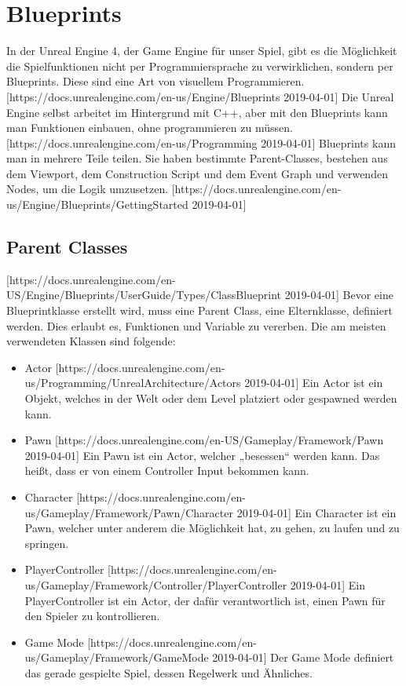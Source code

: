 \section{Blueprints}
In der Unreal Engine 4, der Game Engine für unser Spiel, gibt es die Möglichkeit die Spielfunktionen nicht per Programmiersprache zu verwirklichen, sondern per Blueprints.
Diese sind eine Art von visuellem Programmieren. [https://docs.unrealengine.com/en-us/Engine/Blueprints 2019-04-01]
Die Unreal Engine selbst arbeitet im Hintergrund mit C++, aber mit den Blueprints kann man Funktionen einbauen, ohne programmieren zu müssen. [https://docs.unrealengine.com/en-us/Programming 2019-04-01]
Blueprints kann man in mehrere Teile teilen.
Sie haben bestimmte Parent-Classes, bestehen aus dem Viewport, dem Construction Script und dem Event Graph und verwenden Nodes, um die Logik umzusetzen. [https://docs.unrealengine.com/en-us/Engine/Blueprints/GettingStarted 2019-04-01]
\subsection{Parent Classes} [https://docs.unrealengine.com/en-US/Engine/Blueprints/UserGuide/Types/ClassBlueprint 2019-04-01]
Bevor eine Blueprintklasse erstellt wird, muss eine Parent Class, eine Elternklasse, definiert werden.
Dies erlaubt es, Funktionen und Variable zu vererben.
Die am meisten verwendeten Klassen sind folgende:
\begin{itemize}
    \item Actor [https://docs.unrealengine.com/en-us/Programming/UnrealArchitecture/Actors 2019-04-01]
    Ein Actor ist ein Objekt, welches in der Welt oder dem Level platziert oder gespawned werden kann.
    \item Pawn [https://docs.unrealengine.com/en-US/Gameplay/Framework/Pawn 2019-04-01]
    Ein Pawn ist ein Actor, welcher „besessen“ werden kann.
    Das heißt, dass er von einem Controller Input bekommen kann.
    \item Character [https://docs.unrealengine.com/en-us/Gameplay/Framework/Pawn/Character 2019-04-01]
    Ein Character ist ein Pawn, welcher unter anderem die Möglichkeit hat, zu gehen, zu laufen und zu springen.
    \item PlayerController [https://docs.unrealengine.com/en-us/Gameplay/Framework/Controller/PlayerController 2019-04-01]
    Ein PlayerController ist ein Actor, der dafür verantwortlich ist, einen Pawn für den Spieler zu kontrollieren.
    \item Game Mode [https://docs.unrealengine.com/en-us/Gameplay/Framework/GameMode 2019-04-01]
    Der Game Mode definiert das gerade gespielte Spiel, dessen Regelwerk und Ähnliches.
\end{itemize}
